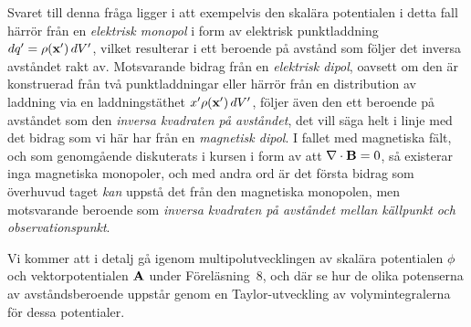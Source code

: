 Svaret till denna fr{\aa}ga ligger i att exempelvis den skal{\"a}ra potentialen
i detta fall h{\"a}rr{\"o}r fr{\aa}n en {\it elektrisk monopol} i form av
elektrisk punktladdning $dq'=\rho({\bf x}')\,dV'$, vilket resulterar i ett
beroende p{\aa} avst{\aa}nd som f{\"o}ljer det inversa avst{\aa}ndet rakt av.
Motsvarande bidrag fr{\aa}n en {\it elektrisk dipol}, oavsett om den {\"a}r
konstruerad fr{\aa}n tv{\aa} punktladdningar eller h{\"a}rr{\"o}r fr{\aa}n en
distribution av laddning via en laddningst{\"a}thet $x'\rho({\bf x}')\,dV'$,
f{\"o}ljer {\"a}ven den ett beroende p{\aa} avst{\aa}ndet som den {\it inversa
kvadraten p{\aa} avst{\aa}ndet}, det vill s{\"a}ga helt i linje med det bidrag
som vi h{\"a}r har fr{\aa}n en {\it magnetisk dipol}.
I fallet med magnetiska f{\"a}lt, och som genomg{\aa}ende diskuterats i kursen
i form av att $\nabla\cdot{\bf B}=0$, s{\aa} existerar inga magnetiska
monopoler, och med andra ord {\"a}r det f{\"o}rsta bidrag som {\"o}verhuvud
taget {\it kan} uppst{\aa} det fr{\aa}n den magnetiska monopolen, men
motsvarande beroende som {\it inversa kvadraten p{\aa} avst{\aa}ndet mellan
k{\"a}llpunkt och observationspunkt}.

Vi kommer att i detalj g{\aa} igenom multipolutvecklingen av skal{\"a}ra
potentialen $\phi$ och vektorpotentialen ${\bf A}$ under F{\"o}rel{\"a}sning~8,
och d{\"a}r se hur de olika potenserna av avst{\aa}ndsberoende uppst{\aa}r
genom en Taylor-utveckling av volymintegralerna f{\"o}r dessa potentialer.
\vfill\eject

